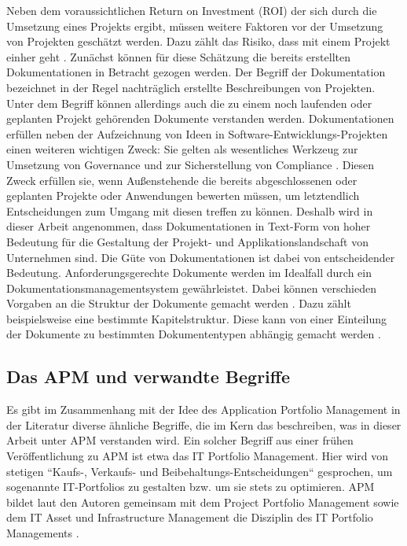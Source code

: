 Neben dem voraussichtlichen Return on Investment (ROI) der sich durch die Umsetzung eines Projekts ergibt, müssen weitere Faktoren vor der Umsetzung von Projekten geschätzt werden. Dazu zählt das Risiko, dass mit einem Projekt einher geht \cite[S. 120ff.]{gadatsch}. Zunächst können für diese Schätzung die bereits erstellten Dokumentationen in Betracht gezogen werden. Der Begriff der Dokumentation bezeichnet in der Regel nachträglich erstellte Beschreibungen von Projekten. Unter dem Begriff können allerdings auch die zu einem noch laufenden oder geplanten Projekt gehörenden Dokumente verstanden werden. Dokumentationen erfüllen neben der Aufzeichnung von Ideen in Software-Entwicklungs-Projekten einen weiteren wichtigen Zweck: Sie gelten als wesentliches Werkzeug zur Umsetzung von Governance und zur Sicherstellung von Compliance \cite[S. 2]{reiss}. Diesen Zweck erfüllen sie, wenn Außenstehende die bereits abgeschlossenen oder geplanten Projekte oder Anwendungen bewerten müssen, um letztendlich Entscheidungen zum Umgang mit diesen treffen zu können. Deshalb wird in dieser Arbeit angenommen, dass Dokumentationen in Text-Form von hoher Bedeutung für die Gestaltung der Projekt- und Applikationslandschaft von Unternehmen sind. Die Güte von Dokumentationen ist dabei von entscheidender Bedeutung. Anforderungsgerechte Dokumente werden im Idealfall durch ein Dokumentationsmanagementsystem gewährleistet. Dabei können verschieden Vorgaben an die Struktur der Dokumente gemacht werden \cite[S. 29]{reiss}. Dazu zählt beispielsweise eine bestimmte Kapitelstruktur. Diese kann von einer Einteilung der Dokumente zu bestimmten Dokumententypen abhängig gemacht werden \cite[S. 34-39]{reiss}.

\subsection {Das APM und verwandte Begriffe}
Es gibt im Zusammenhang mit der Idee des Application Portfolio Management in der Literatur diverse ähnliche Begriffe, die im Kern das beschreiben, was in dieser Arbeit unter APM verstanden wird. Ein solcher Begriff aus einer frühen Veröffentlichung zu APM ist etwa das IT Portfolio Management. Hier wird von stetigen ``Kaufs-, Verkaufs- und Beibehaltungs-Entscheidungen`` gesprochen, um sogenannte IT-Portfolios zu gestalten bzw. um sie stets zu optimieren. APM bildet laut den Autoren gemeinsam mit dem Project Portfolio Management sowie dem IT Asset und Infrastructure Management die Disziplin des IT Portfolio Managements \cite[S. 2-14]{Gliedman}.

